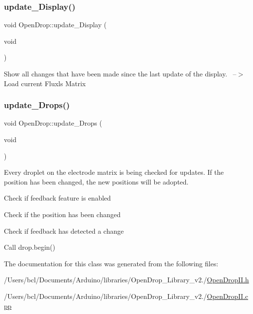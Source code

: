 \subsubsection{\texorpdfstring{update\+\_\+\+Display()}{update\_Display()}}
{\footnotesize\ttfamily void Open\+Drop\+::update\+\_\+\+Display (\begin{DoxyParamCaption}\item[{void}]{ }\end{DoxyParamCaption})}

Show all changes that have been made since the last update of the display.~\newline
--$>$ Load current Fluxls Matrix \mbox{\label{class_open_drop_ab92f14cd428512fc3572c9a08cb7952e}} 
\subsubsection{\texorpdfstring{update\+\_\+\+Drops()}{update\_Drops()}}
{\footnotesize\ttfamily void Open\+Drop\+::update\+\_\+\+Drops (\begin{DoxyParamCaption}\item[{void}]{ }\end{DoxyParamCaption})}

Every droplet on the electrode matrix is being checked for updates. If the position has been changed, the new positions will be adopted.
\begin{DoxyEnumerate}
\item Check if feedback feature is enabled~\newline

\item Check if the position has been changed~\newline

\item Check if feedback has detected a change~\newline

\item Call drop.\+begin() 
\end{DoxyEnumerate}

The documentation for this class was generated from the following files\+:\begin{DoxyCompactItemize}
\item 
/\+Users/bcl/\+Documents/\+Arduino/libraries/\+Open\+Drop\+\_\+\+Library\+\_\+v2./\mbox{\hyperlink{_open_drop_i_i_8h}{Open\+Drop\+I\+I.\+h}}\item 
/\+Users/bcl/\+Documents/\+Arduino/libraries/\+Open\+Drop\+\_\+\+Library\+\_\+v2./\mbox{\hyperlink{_open_drop_i_i_8cpp}{Open\+Drop\+I\+I.\+cpp}}\end{DoxyCompactItemize}
